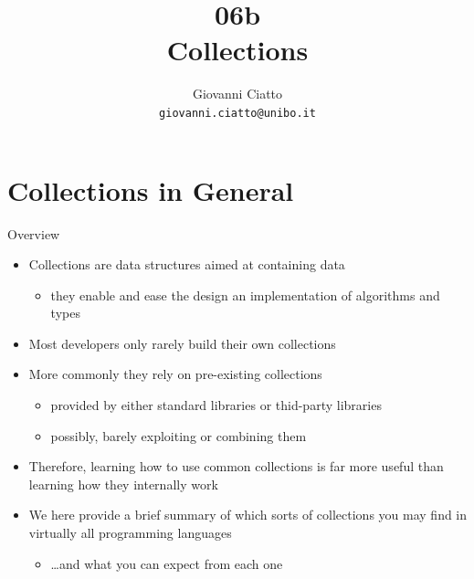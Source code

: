 \documentclass[presentation]{beamer}
\title[\lecturecode{06b}]{06b \\ \dotnet Collections}
\author[Giovanni Ciatto]{Giovanni Ciatto\\\texttt{giovanni.ciatto@unibo.it}}
\begin{document}
\frame[label=coverpage]{\titlepage}

\section{Collections in General}

\begin{frame}{Overview}
  \begin{itemize}

    \item Collections are data structures aimed at containing data
    \begin{itemize}
      \item they enable and ease the design an implementation of algorithms and types
    \end{itemize}

    \vfill

    \item Most developers only rarely build their own collections
    
    \vfill

    \item More commonly they rely on pre-existing collections
    \begin{itemize}
      \item provided by either standard libraries or thid-party libraries
      \item possibly, barely exploiting or combining them
    \end{itemize}

    \vfill

    \item Therefore, learning \alert{how to use} common collections is far more useful than learning how they internally work
    
    \vfill

    \item We here provide a brief summary of \alert{which sorts} of collections you may find in \alert{virtually all} programming languages
    \begin{itemize}
      \item \ldots and what you can expect from each one
    \end{itemize}    
    
  \end{itemize}
\end{frame}
\end{document}
